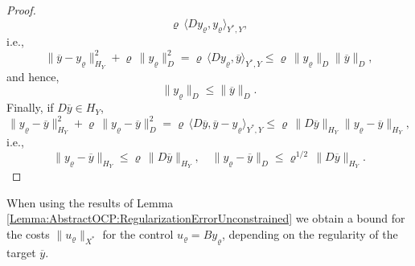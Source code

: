 \documentclass{article}
\numberwithin{equation}{section}
\begin{document}
\begin{proof}
\[    \varrho \, \langle D y_\varrho , y_\varrho \rangle_{Y^*,Y},
  \]
  i.e.,
  \[
    \| \overline{y} - y_\varrho \|^2_{H_Y}
    +
    \varrho \, \| y_\varrho \|^2_D
    =
    \varrho \, \langle D y_\varrho , \overline{y} \rangle_{Y^*,Y}
    \leq \varrho \, \| y_\varrho \|_D \| \overline{y} \|_D ,
  \]
  and hence,
  \[
    \| y_\varrho \|_D \leq \| \overline{y} \|_D .
  \]
  Finally, if $D \overline{y} \in H_Y$,
  \[
    \| y_\varrho - \overline{y} \|_{H_Y}^2 + \varrho \,
    \| y_\varrho - \overline{y} \|_D^2 =
    \varrho \, \langle D \overline{y} , \overline{y} - y_\varrho \rangle_{Y^*,Y}
    \leq \varrho \, \| D \overline{y} \|_{H_Y}
    \| y_\varrho - \overline{y} \|_{H_Y},
  \]
  i.e.,
  \[
    \| y_\varrho - \overline{y} \|_{H_Y} \leq
    \varrho \, \| D \overline{y} \|_{H_Y}, \quad
    \| y_\varrho - \overline{y} \|_D \leq \varrho^{1/2} \,
    \| D \overline{y} \|_{H_Y} .
  \]
\end{proof}

\noindent
When using the results of
Lemma \ref{Lemma:AbstractOCP:RegularizationErrorUnconstrained}
we obtain a bound for the costs $\| u_\varrho \|_{X^*}$ for the
control $u_\varrho = B y_\varrho$, depending on the regularity of
the target $\overline{y}$.
\end{document}
